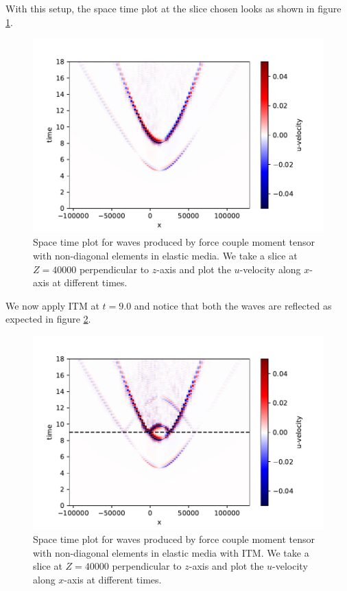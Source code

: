 With this setup, the space time plot at the slice chosen looks as shown in figure \ref{fig:space-timeplot-doublecoupletorinoITM}.

\begin{figure}[!htpb]
    \centering
    \includegraphics[width=0.8\linewidth]{figures/double-couple-tori-noITM.pdf}
    \caption{Space time plot for waves produced by force couple moment tensor with non-diagonal elements in elastic media. We take a slice at $Z=40000$ perpendicular to $z$-axis and plot the $u$-velocity along $x$-axis at different times.}
    \label{fig:space-timeplot-doublecoupletorinoITM}
\end{figure}

We now apply \ac{ITM} at $t=9.0$ and notice that both the waves are reflected as expected in figure \ref{fig:space-timeplot-doublecoupletoriITM}.

\begin{figure}[!htpb]
    \centering
    \includegraphics[width=0.75\linewidth]{figures/double-couple-tori2.pdf}
    \caption{Space time plot for waves produced by force couple moment tensor with non-diagonal elements in elastic media with \ac{ITM}. We take a slice at $Z=40000$ perpendicular to $z$-axis and plot the $u$-velocity along $x$-axis at different times.}
    \label{fig:space-timeplot-doublecoupletoriITM}
\end{figure}

